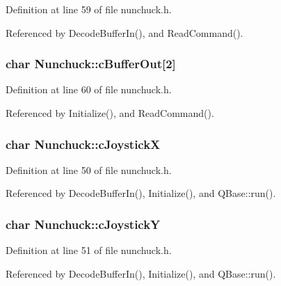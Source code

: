 Definition at line 59 of file nunchuck.\-h.



Referenced by Decode\-Buffer\-In(), and Read\-Command().

\hypertarget{classNunchuck_a4f2eea10fb4eba245c24168ce00429f8}{
\subsubsection[{c\-Buffer\-Out}]{\setlength{\rightskip}{0pt plus 5cm}char Nunchuck\-::c\-Buffer\-Out\mbox{[}2\mbox{]}\hspace{0.3cm}{\ttfamily [private]}}}\label{classNunchuck_a4f2eea10fb4eba245c24168ce00429f8}


Definition at line 60 of file nunchuck.\-h.



Referenced by Initialize(), and Read\-Command().

\hypertarget{classNunchuck_ad9467642b97b8b008ddd137d273a22f8}{
\subsubsection[{c\-Joystick\-X}]{\setlength{\rightskip}{0pt plus 5cm}char Nunchuck\-::c\-Joystick\-X}}\label{classNunchuck_ad9467642b97b8b008ddd137d273a22f8}


Definition at line 50 of file nunchuck.\-h.



Referenced by Decode\-Buffer\-In(), Initialize(), and Q\-Base\-::run().

\hypertarget{classNunchuck_aaf0f299016f5acf686f716518a7ce567}{
\subsubsection[{c\-Joystick\-Y}]{\setlength{\rightskip}{0pt plus 5cm}char Nunchuck\-::c\-Joystick\-Y}}\label{classNunchuck_aaf0f299016f5acf686f716518a7ce567}


Definition at line 51 of file nunchuck.\-h.



Referenced by Decode\-Buffer\-In(), Initialize(), and Q\-Base\-::run().

